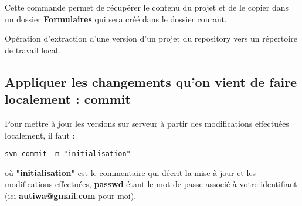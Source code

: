 \documentclass[a4paper,twoside]{article}
\begin{document}
Cette commande permet de récupérer le contenu du projet et de le copier dans un dossier \textbf{Formulaires} qui sera créé dans le dossier courant.

\begin{definition}[Checkout]
Opération d'extraction d'une version d'un projet du repository vers un répertoire de travail local.
\end{definition}


\subsection{Appliquer les changements qu'on vient de faire localement : commit}

Pour mettre à jour les versions sur serveur à partir des modifications effectuées localement, il faut : 
\begin{verbatim}
svn commit -m "initialisation"
\end{verbatim}
où \textbf{"initialisation"} est le commentaire qui décrit la mise à jour et les modifications effectuées, \textbf{passwd} étant le mot de passe associé à votre identifiant (ici \textbf{autiwa@gmail.com} pour moi).
\end{document}
